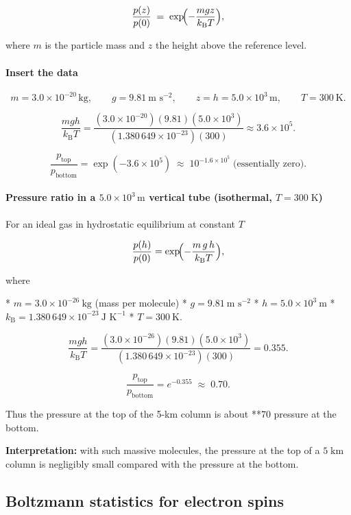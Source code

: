 \documentclass[12pt]{article}
\theoremstyle{definition} %
\theoremstyle{plain} %
\begin{document}
\[
  \frac{p(z)}{p(0)} \;=\;
  \exp\!\Bigl(-\frac{m g z}{k_{\mathrm B}T}\Bigr),
\]

where \(m\) is the particle mass and \(z\) the height above the reference
level.

\paragraph{Insert the data}
\[
  m = 3.0\times10^{-20}\,\text{kg},\qquad
  g = 9.81\ \text{m s}^{-2},\qquad
  z = h = 5.0\times10^{3}\,\text{m},\qquad
  T = 300\ \text{K}.
\]

\[
  \frac{m g h}{k_{\mathrm B}T}
  = \frac{(3.0\times10^{-20})(9.81)(5.0\times10^{3})}
         {(1.380\,649\times10^{-23})(300)}
  \approx 3.6\times10^{5}.
\]

\[
  \boxed{\frac{p_{\text{top}}}{p_{\text{bottom}}}
         = \exp(-3.6\times10^{5})
         \;\approx\; 10^{-1.6\times10^{5}}\;\text{(essentially zero).}}
\]
\paragraph{Pressure ratio in a \(5.0\times10^{3}\,\text{m}\) vertical tube
(isothermal, \(T = 300\;\text{K}\))}

For an ideal gas in hydrostatic equilibrium at constant \(T\)

\[
  \frac{p(h)}{p(0)}
  = \exp\!\Bigl(-\frac{m\,g\,h}{k_{\mathrm B}T}\Bigr),
\]

where  

* \(m = 3.0\times10^{-26}\ \text{kg}\) (mass per molecule)  
* \(g = 9.81\ \text{m s}^{-2}\)  
* \(h = 5.0\times10^{3}\ \text{m}\)  
* \(k_{\mathrm B}=1.380\,649\times10^{-23}\ \text{J K}^{-1}\)  
* \(T = 300\ \text{K}\).

\[
  \frac{mgh}{k_{\mathrm B}T}
  =\frac{(3.0\times10^{-26})(9.81)(5.0\times10^{3})}
        {(1.380\,649\times10^{-23})(300)}
  = 0.355.
\]

\[
  \boxed{\frac{p_{\text{top}}}{p_{\text{bottom}}}
        = e^{-0.355}\;\approx\;0.70 }.
\]

Thus the pressure at the top of the 5-km column is about **70 %
pressure at the bottom.

\textbf{Interpretation:} with such massive molecules, the pressure at the
top of a \(5\;\text{km}\) column is negligibly small compared with the
pressure at the bottom.
\subsection*{Boltzmann statistics for electron spins}
\end{document}
